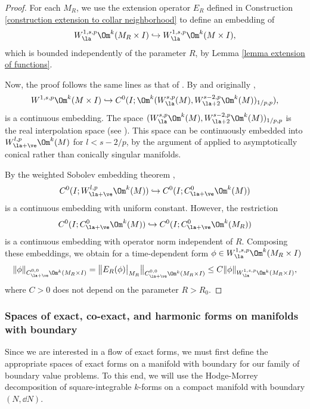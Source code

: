 \documentclass[hidelinks, 12pt, oneside, reqno]{amsart}
\begin{document}
\begin{proof} 
    For each $M_R$, we use the extension operator $E_R$ defined in Construction \ref{construction extension to collar neighborhood} to define an embedding of 
    \[
    W^{1,s,p}_\la \Om^k(M_R \times I) \hookrightarrow W^{1,s,p}_\la \Om^k(M \times I),
    \]
    which is bounded independently of the parameter $R$, by Lemma \ref{lemma extension of functions}. 
    
    Now, the proof follows the same lines as that of \cite[Proposition 7.2]{LMCFwithsings}. By \cite[Proposition 2.4]{LMCFwithsings} and originally \cite[Ch. III, Thm. 4.10.2]{Amann}, 
    \[
    W^{1,s,p} \Om^k (M \times I) \hookrightarrow C^0(I; \Om^k(W^{s,p}_\la (M), W^{s-2,p}_{\la + 2} \Om^k(M))_{1/p,p}),
    \]
    is a continuous embedding. The space $(W^{s,p}_\la \Om^k (M), W^{s-2,p}_{\la + 2} \Om^k (M))_{1/p,p}$ is the real interpolation space (see \cite[Ch. 1, \S 2.4]{Amann}). This space can be continuously embedded into $W^{l,p}_{\la + \ve}\Om^k (M)$ for $l < s - 2/p$, by the argument of \cite[Lemma 5.4]{CoriascoDiffOps} applied to asymptotically conical rather than conically singular manifolds. 
    
    By the weighted Sobolev embedding theorem \cite[Theorem 2.9]{JoyceDesing1}, 
    \[
    C^0(I;W^{l,p}_{\la + \ve}\Om^k (M)) \hookrightarrow C^0(I;C^{0}_{\la + \ve}\Om^k (M))
    \]
    is a continuous embedding with uniform constant. However, the restriction
    \[
    C^0(I;C^{0}_{\la + \ve}\Om^k (M)) \hookrightarrow C^0(I;C^{0}_{\la + \ve}\Om^k (M_R))
    \]
    is a continuous embedding with operator norm independent of $R$. Composing these embeddings, we obtain for a time-dependent form $\phi \in W^{1,s,p}_\la \Om^k(M_R \times I)$
    \[
    \|\phi\|_{C^{0,0}_{\la + \ve}\Om^k(M_R \times I)} = \big\|E_R(\phi)\big|_{M_R}\big\|_{C^{0,0}_{\la + \ve}\Om^k(M_R \times I)} \le C \|\phi\|_{W^{1,s,p}_\la \Om^k(M_R \times I)},
    \]
    where $C>0$ does not depend on the parameter $R > R_0$.
\end{proof}

\subsubsection{Spaces of exact, co-exact, and harmonic forms on manifolds with boundary}\label{section hodge morrey}

Since we are interested in a flow of exact forms, we must first define the appropriate spaces of exact forms on a manifold with boundary for our family of boundary value problems.  To this end, we will use the Hodge-Morrey decomposition of square-integrable $k$-forms on a compact manifold with boundary $(N, \dd N)$. 
\end{document}
